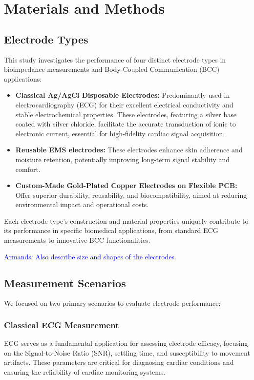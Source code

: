 \documentclass[conference]{IEEEtran}
\newcommand{\notea}[1]{\textcolor{blue}{Armands: #1}}
\begin{document}



\section{Materials and Methods}

\subsection{Electrode Types}
This study investigates the performance of four distinct electrode types in bioimpedance measurements and Body-Coupled Communication (BCC) applications:
\begin{itemize}
    \item \textbf{Classical Ag/AgCl Disposable Electrodes:} Predominantly used in electrocardiography (ECG) for their excellent electrical conductivity and stable electrochemical properties. These electrodes, featuring a silver base coated with silver chloride, facilitate the accurate transduction of ionic to electronic current, essential for high-fidelity cardiac signal acquisition.
    
    \item \textbf{Reusable EMS electrodes:} These electrodes enhance skin adherence and moisture retention, potentially improving long-term signal stability and comfort.
    
    \item \textbf{Custom-Made Gold-Plated Copper Electrodes on Flexible PCB:} Offer superior durability, reusability, and biocompatibility, aimed at reducing environmental impact and operational costs.
    
\end{itemize}

Each electrode type's construction and material properties uniquely contribute to its performance in specific biomedical applications, from standard ECG measurements to innovative BCC functionalities. 

\notea{Also describe size and shapes of the electrodes.}

\subsection{Measurement Scenarios}
We focused on two primary scenarios to evaluate electrode performance:

\subsubsection{Classical ECG Measurement}
ECG serves as a fundamental application for assessing electrode efficacy, focusing on the Signal-to-Noise Ratio (SNR), settling time, and susceptibility to movement artifacts. These parameters are critical for diagnosing cardiac conditions and ensuring the reliability of cardiac monitoring systems.
\end{document}
